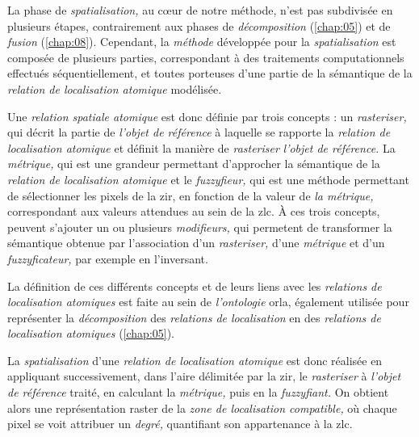 La phase de \emph{spatialisation,} au cœur de notre méthode, n'est pas
subdivisée en plusieurs étapes, contrairement aux phases de
\emph{décomposition} (\autoref{chap:05}) et de \emph{fusion}
(\autoref{chap:08}). Cependant, la \emph{méthode} développée pour la
\emph{spatialisation} est composée de plusieurs parties, correspondant
à des traitements computationnels effectués séquentiellement, et
toutes porteuses d'une partie de la sémantique de la \emph{relation de
  localisation atomique} modélisée.

Une \emph{relation spatiale atomique} est donc définie par trois
concepts : un \emph{rasteriser,} qui décrit la partie de \emph{l'objet
  de référence} à laquelle se rapporte la \emph{relation de
  localisation atomique} et définit la manière de \emph{rasteriser}
\emph{l'objet de référence.} La \emph{métrique,} qui est une grandeur
permettant d'approcher la sémantique de la \emph{relation de
  localisation atomique} et le \emph{fuzzyfieur,} qui est une méthode
permettant de sélectionner les pixels de la \ac{zir}, en fonction de
la valeur de \emph{la métrique,} correspondant aux valeurs attendues
au sein de la \ac{zlc}. À ces trois concepts, peuvent s'ajouter un ou
plusieurs \emph{modifieurs,} qui permetent de transformer la
sémantique obtenue par l'association d'un \emph{rasteriser,} d'une
\emph{métrique} et d'un \emph{fuzzyficateur,} par exemple en
l'inversant.

La définition de ces différents concepts et de leurs liens avec les
\emph{relations de localisation atomiques} est faite au sein de
\emph{l'ontologie} \ac{orla}, également utilisée pour représenter la
\emph{décomposition} des \emph{relations de localisation} en des
\emph{relations de localisation atomiques} (\autoref{chap:05}).

La \emph{spatialisation} d'une \emph{relation de localisation
  atomique} est donc réalisée en appliquant successivement, dans
l'aire délimitée par la \ac{zir}, le \emph{rasteriser} à \emph{l'objet
  de référence} traité, en calculant la \emph{métrique,} puis en la
\emph{fuzzyfiant.} On obtient alors une représentation raster de la
\emph{zone de localisation compatible,} où chaque pixel se voit
attribuer un \emph{degré,} quantifiant son appartenance à la \ac{zlc}.


